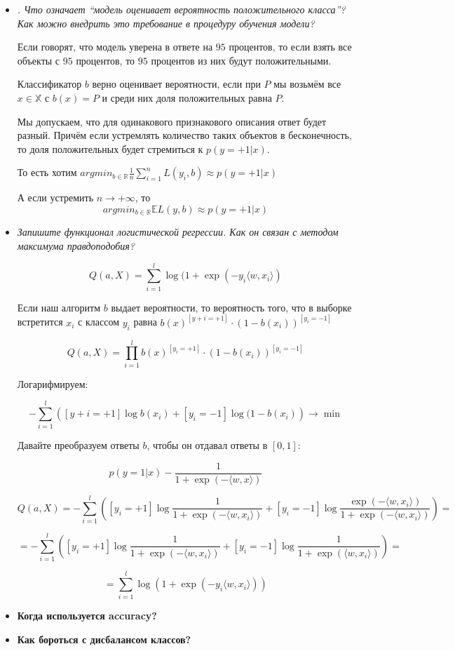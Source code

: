 \documentclass[a4paper]{article}
\begin{document}
\begin{itemize}
\item \textit{. Что означает “модель оценивает вероятность положительного класса”? Как можно
внедрить это требование в процедуру обучения модели?}

Если говорят, что модель уверена в ответе на $95$ процентов, то если взять все объекты с $95$ процентов, то $95$ процентов из них будут положительными.

Классификатор $b$ верно оценивает вероятности, если при $P$ мы возьмём все $x \in \mathbb{X}$ с $b(x) = P$ и среди них доля положительных равна $P$.

Мы допускаем, что для одинакового признакового описания ответ будет разный. Причём если устремлять количество таких объектов в бесконечность, то доля положительных будет стремиться к $p(y=+1|x)$.

То есть хотим $argmin_{b \in \mathbb{R}} \frac{1}{n} \sum_{i=1}^n L(y_i, b) \approx p(y=+1|x)$

А если устремить $n \rightarrow +\infty$, то 
\[ argmin_{b \in \mathbb{R}} \mathbb{E} L(y, b) \approx p(y=+1|x) \]

\item \textit{Запишите функционал логистической регрессии. Как он связан с методом максимума
правдоподобия?}

\[ Q(a, X) =  \sum_{i=1}^l \log (1+\exp(-y_i \langle w, x_i \rangle )\]

Если наш алгоритм $b$ выдает вероятности, то вероятность того, что в выборке встретится $x_i$ с классом $y_i$ равна $b(x)^{[y+i = +1]}\cdot (1-b(x_i))^{[y_i=-1]}$

\[ Q(a, X) = \prod_{i=1}^l b(x)^{[y_i = +1]}\cdot (1-b(x_i))^{[y_i=-1]} \]

Логарифмируем:

\[ - \sum_{i=1}^l \left( [y+i = +1] \log b(x_i) + [y_i = -1] \log (1-b(x_i) \right) \rightarrow \min \]

Давайте преобразуем ответы $b$, чтобы он отдавал ответы в $[0,1]$:

\[ p(y=1|x) - \frac{1}{1+\exp(-\langle w, x \rangle)} \]

\[ Q(a, X) = - \sum_{i=1}^l \left( [y_i = +1] \log \frac{1}{1+\exp(-\langle w, x_i \rangle)} + [y_i = -1] \log \frac{\exp(-\langle w, x_i \rangle)}{1 + \exp(-\langle w, x_i \rangle)} \right) = \]

\[
= - \sum_{i=1}^l \left( [y_i = +1] \log \frac{1}{1+\exp(-\langle w, x_i \rangle)} + [y_i = -1] \log \frac{1}{1 + \exp(\langle w, x_i \rangle)} \right) = 
\]

\[ = \sum_{i=1}^l \log \left( 1+\exp(-y_i \langle w, x_i \rangle) \right) \]

\item \textbf{Когда используется accuracy?}

\item \textbf{Как бороться с дисбалансом классов?}


\end{itemize}
\end{document}
